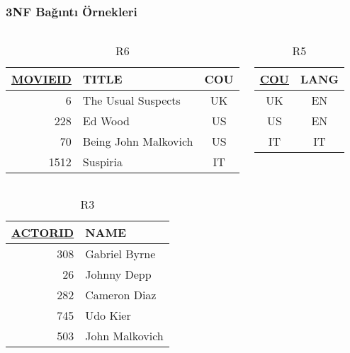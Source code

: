 \documentclass[dvipsnames]{beamer}
\theoremstyle{theorem}
\begin{document}
\begin{frame}
\label{example_db_3}
  \frametitle{3NF Bağıntı Örnekleri}

  \vspace{-24pt}
  \begin{columns}[t]
    \begin{footnotesize}
    \begin{table}
      \caption{R6}
      \begin{tabular}{|r|l|c|}\hline
\underline{MOVIEID} & TITLE    & COU\\[2pt]\hline\hline
      6 & The Usual Suspects   & UK \\\hline
    228 & Ed Wood              & US \\\hline
     70 & Being John Malkovich & US \\\hline
   1512 & Suspiria             & IT \\\hline
      \end{tabular}
    \end{table}
    \end{footnotesize}

    \begin{footnotesize}
    \begin{table}
      \caption{R5}
      \begin{tabular}{|c|c|}\hline
\underline{COU} & LANG\\[2pt]\hline\hline
UK & EN\\\hline
US & EN\\\hline
IT & IT\\\hline
      \end{tabular}
    \end{table}
    \end{footnotesize}
  \end{columns}

  \vspace{-24pt}
  \begin{columns}[t]
    \begin{footnotesize}
    \begin{table}
      \caption{R3}
      \begin{tabular}{|r|l|}\hline
\underline{ACTORID} & NAME\\[2pt]\hline\hline
      308 & Gabriel Byrne \\\hline
       26 & Johnny Depp   \\\hline
      282 & Cameron Diaz  \\\hline
      745 & Udo Kier      \\\hline
      503 & John Malkovich\\\hline
      \end{tabular}
    \end{table}
    \end{footnotesize}


\end{columns}
\end{frame}
\end{document}
